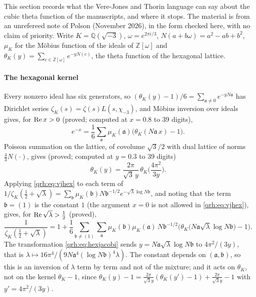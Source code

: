 This section records what the Vere-Jones and Thorin language can say about the cubic theta function of the manuscripts, and where it stops. The material is from an unrefereed note of Polson (November 2026), in the form checked here, with no claim of priority. Write $K=\mathbb Q(\sqrt{-3})$, $\omega=e^{2\pi i/3}$, $N(a+b\omega)=a^2-ab+b^2$, $\mu_K$ for the M\"obius function of the ideals of $\mathbb Z[\omega]$ and $\theta_K(y)=\sum_{c\in\mathbb Z[\omega]}e^{-yN(c)}$, the theta function of the hexagonal lattice.

\paragraph{The hexagonal kernel} Every nonzero ideal has six generators, so $(\theta_K(y)-1)/6=\sum_{\mathfrak a\ne0}e^{-yN\mathfrak a}$ has Dirichlet series $\zeta_K(s)=\zeta(s)L(s,\chi_{-3})$, and M\"obius inversion over ideals gives, for $\operatorname{Re} x>0$ (proved; computed at $x=0.8$ to 39 digits),
\begin{equation}\label{qrh:eq:vjhex}
e^{-x}=\frac16\sum_{\mathfrak a}\mu_K(\mathfrak a)\big(\theta_K(N\mathfrak a\,x)-1\big).
\end{equation}
Poisson summation on the lattice, of covolume $\sqrt3/2$ with dual lattice of norms $\frac43N(\cdot)$, gives (proved; computed at $y=0.3$ to 39 digits)
\begin{equation}\label{qrh:eq:hexjacobi}
\theta_K(y)=\frac{2\pi}{\sqrt3\,y}\,\theta_K\Big(\frac{4\pi^2}{3y}\Big).
\end{equation}
Applying \eqref{qrh:eq:vjhex} to each term of $1/\zeta_K(\frac12+\sqrt\lambda)=\sum_{\mathfrak b}\mu_K(\mathfrak b)N\mathfrak b^{-1/2}e^{-\sqrt\lambda\log N\mathfrak b}$, and noting that the term $\mathfrak b=(1)$ is the constant $1$ (the argument $x=0$ is not allowed in \eqref{qrh:eq:vjhex}), gives, for $\operatorname{Re}\sqrt\lambda>\frac12$ (proved),
\begin{equation}\label{qrh:eq:vjKhex}
\frac1{\zeta_K(\frac12+\sqrt\lambda)}=1+\frac16\sum_{\mathfrak b\ne(1)}\sum_{\mathfrak a}\mu_K(\mathfrak b)\mu_K(\mathfrak a)\,N\mathfrak b^{-1/2}\Big(\theta_K\big(N\mathfrak a\sqrt\lambda\log N\mathfrak b\big)-1\Big).
\end{equation}
The transformation \eqref{qrh:eq:hexjacobi} sends $y=N\mathfrak a\sqrt\lambda\log N\mathfrak b$ to $4\pi^2/(3y)$, that is $\lambda\mapsto16\pi^4/(9N\mathfrak a^4(\log N\mathfrak b)^4\lambda)$. The constant depends on $(\mathfrak a,\mathfrak b)$, so this is an inversion of $\lambda$ term by term and not of the mixture; and it acts on $\theta_K$, not on the kernel $\theta_K-1$, since $\theta_K(y)-1=\frac{2\pi}{\sqrt3y}(\theta_K(y')-1)+\frac{2\pi}{\sqrt3y}-1$ with $y'=4\pi^2/(3y)$.

